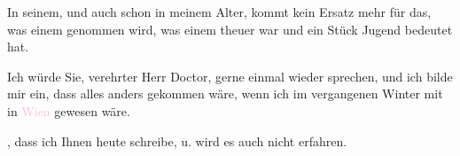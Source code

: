 \pstart
           In seinem, und auch {\pb}schon in meinem Alter, kommt kein
               Ersatz mehr für das, was einem genommen wird, was einem theuer war und ein Stück
               Jugend bedeutet hat.\pend
           
\pstart
           Ich würde Sie, verehrter Herr Doctor, gerne einmal wieder sprechen, und ich bilde mir
               ein, dass alles anders gekommen wäre, wenn ich im vergangenen Winter mit in \textcolor{pink}{Wien}{}\ledrightnote{\textcolor{pink}{Wien}} gewesen wäre.\pend
           
\pstart
           \label{K_L03540-4v}\label{K_L03540-4h}, dass ich Ihnen heute schreibe, u. wird es auch nicht erfahren.\pend
           
